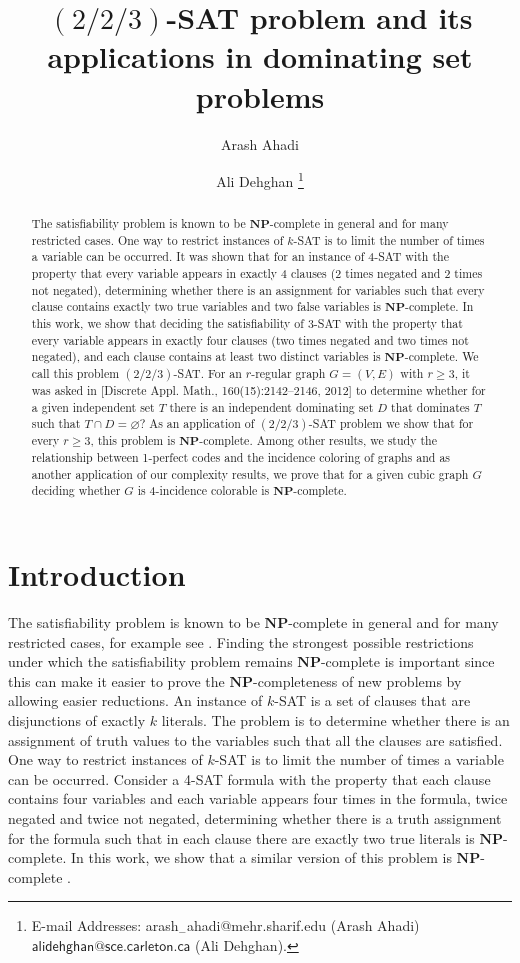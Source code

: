 \documentclass[
final
]{dmtcs-episciences}
\author{Arash Ahadi\affiliationmark{1}
	\and Ali Dehghan \affiliationmark{2}
	\thanks{E-mail Addresses: 
		   arash$_{-}$ahadi@mehr.sharif.edu (Arash Ahadi) $\mathsf{alidehghan@sce.carleton.ca}$ (Ali Dehghan).}}
\title[$(2/2/3)$-SAT problem and its applications in dominating set problems]{$(2/2/3)$-SAT problem and its applications in dominating set problems}
\affiliation{
Department of
	Mathematical Sciences, Sharif University of Technology, Tehran,
	Iran\\
	Systems and Computer Engineering Department, Carleton University, Ottawa,   Canada
}
\begin{document}
\maketitle
\begin{abstract}{
The satisfiability problem is known to be $\mathbf{NP}$-complete in general and for many restricted
cases. One way to restrict instances of $k$-SAT is to limit the number of times a variable can be occurred. It was shown that for an instance of 4-SAT with the property that every variable appears in exactly 4 clauses (2 times negated and 2 times not negated), determining whether there is an assignment for variables  such that every clause contains exactly two true variables and two false variables is $\mathbf{NP}$-complete. In this work, we show that deciding the satisfiability of 3-SAT with the property that every variable appears in exactly four clauses (two times negated and two times not negated), and each clause contains at least two distinct variables is $ \mathbf{NP} $-complete. We call this problem $(2/2/3)$-SAT. For an  $r$-regular graph $G = (V,E)$ with $r\geq 3$,  it was asked in [Discrete Appl. Math., 160(15):2142--2146, 2012] to determine whether for a given independent set $T $  there is an independent dominating set $D$ that dominates $T$ such that $  T  \cap D =\varnothing $?
As an application of $(2/2/3)$-SAT problem  we show that  for every $r\geq 3$, this problem is  $ \mathbf{NP} $-complete.
Among other results, we study the relationship between 1-perfect codes and the incidence coloring of graphs and as  another application of our complexity results,
we  prove
that for a given cubic graph $G$ deciding whether $G$ is 4-incidence colorable  is $ \mathbf{NP} $-complete.
}\end{abstract}



\section{Introduction}

The satisfiability problem is known to be $ \mathbf{NP} $-complete in general and for many restricted
cases, for example see \cite{MR3544062,  MR3386014, MR3864719, MR2184613, MR3810276, MR2500722}. Finding the strongest possible restrictions under which the satisfiability problem remains $ \mathbf{NP} $-complete
is important since this can make it easier to prove the $ \mathbf{NP} $-completeness
of new problems by allowing easier reductions.
An instance of $k$-SAT is a set of clauses that are disjunctions of exactly $k$ literals. The problem is to determine
whether there is an assignment of truth values to the variables such that all the clauses are satisfied.
One way to restrict instances of $k$-SAT is to limit the number of times a variable can be occurred.
Consider a 4-SAT formula with the property that each clause contains four variables and each variable appears four times in the formula, twice negated and twice not negated,
determining whether there is a truth assignment for the formula such that in each clause there are exactly two true literals is $\mathbf{NP}$-complete. In this work, we show that a similar version of this problem is $\mathbf{NP}$-complete \cite{Puzzle}.
\end{document}

